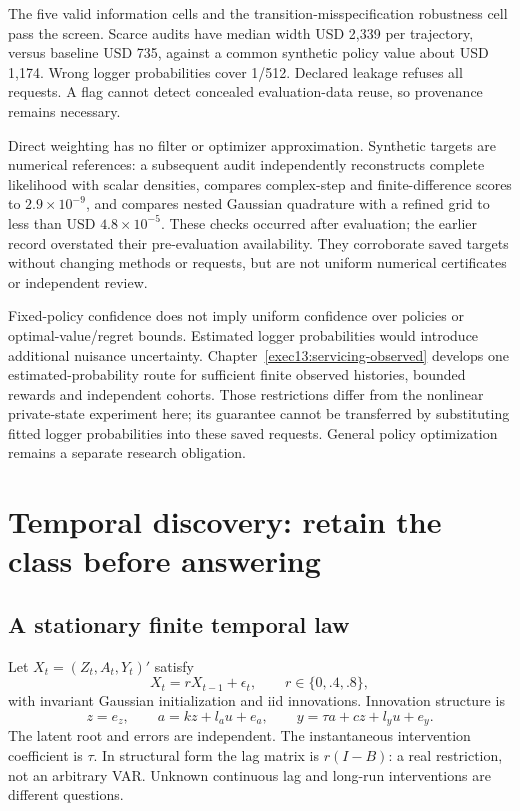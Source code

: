 The five valid information cells and the transition-misspecification robustness cell pass the screen. Scarce audits have median width USD 2,339 per trajectory, versus baseline USD 735, against a common synthetic policy value about USD 1,174. Wrong logger probabilities cover 1/512. Declared leakage refuses all requests. A flag cannot detect concealed evaluation-data reuse, so provenance remains necessary.

Direct weighting has no filter or optimizer approximation. Synthetic targets are numerical references: a subsequent audit independently reconstructs complete likelihood with scalar densities, compares complex-step and finite-difference scores to $2.9\times10^{-9}$, and compares nested Gaussian quadrature with a refined grid to less than USD $4.8\times10^{-5}$. These checks occurred after evaluation; the earlier record overstated their pre-evaluation availability. They corroborate saved targets without changing methods or requests, but are not uniform numerical certificates or independent review.

Fixed-policy confidence does not imply uniform confidence over policies or optimal-value/regret bounds. Estimated logger probabilities would introduce additional nuisance uncertainty. Chapter~\ref{exec13:servicing-observed} develops one estimated-probability route for sufficient finite observed histories, bounded rewards and independent cohorts. Those restrictions differ from the nonlinear private-state experiment here; its guarantee cannot be transferred by substituting fitted logger probabilities into these saved requests. General policy optimization remains a separate research obligation.

\section{Temporal discovery: retain the class before answering}
\subsection{A stationary finite temporal law}
Let $X_t=(Z_t,A_t,Y_t)'$ satisfy
\[
 X_t=rX_{t-1}+\epsilon_t,\qquad r\in\{0,.4,.8\},
\]
with invariant Gaussian initialization and iid innovations. Innovation structure is
\[
 z=e_z,\qquad a=kz+l_au+e_a,\qquad y=\tau a+cz+l_yu+e_y.
\]
The latent root and errors are independent. The instantaneous intervention coefficient is $\tau$. In structural form the lag matrix is $r(I-B)$: a real restriction, not an arbitrary VAR. Unknown continuous lag and long-run interventions are different questions.

